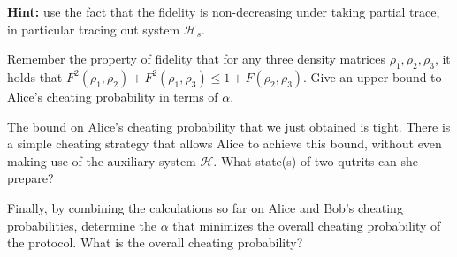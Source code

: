 \documentclass[a4paper,10pt,landscape,twocolumn]{scrartcl}
\newcommand{\Hi}{\mathcal{H}}
\begin{document}
\begin{exercise}
\begin{subex}
\textbf{Hint: } use the fact that the fidelity is non-decreasing under taking partial trace, in particular tracing out system $\Hi_s$.

\end{subex}

\begin{subex}
Remember the property of fidelity that for any three density matrices $\rho_1, \rho_2, \rho_3$, it holds that $F^2(\rho_1, \rho_2) + F^2(\rho_1, \rho_3) \leq 1 + F(\rho_2, \rho_3)$. Give an upper bound to Alice's cheating probability in terms of $\alpha$.
\end{subex}

\begin{subex}
The bound on Alice's cheating probability that we just obtained is tight. There is a simple cheating strategy that allows Alice to achieve this bound, without even making use of the auxiliary system $\Hi$. What state(s) of two qutrits can she prepare?
\end{subex}

\begin{subex}
Finally, by combining the calculations so far on Alice and Bob's cheating probabilities, determine the $\alpha$ that minimizes the overall cheating probability of the protocol. What is the overall cheating probability?
\end{subex}

\end{exercise}
\end{document}
